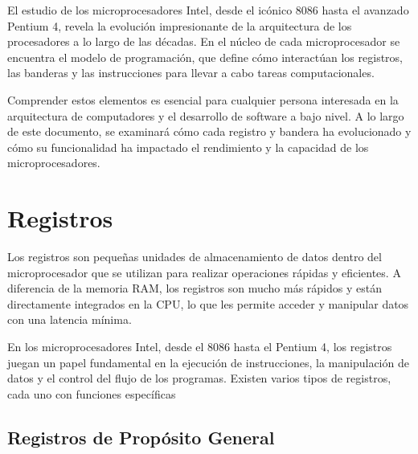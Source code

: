 

	\clearpage
	\vspace*{6pt}
	\begin{center}
		{\textbf{\huge \theTitle}}
	\end{center}
	\vspace*{8pt}


	El estudio de los microprocesadores Intel, desde el icónico 8086 hasta el avanzado
	Pentium 4, revela la evolución impresionante de la arquitectura de los procesadores a lo
	largo de las décadas. En el núcleo de cada microprocesador se encuentra el modelo de
	programación, que define cómo interactúan los registros, las banderas y las
	instrucciones para llevar a cabo tareas computacionales.

	Comprender estos elementos es esencial para cualquier persona interesada en la
	arquitectura de computadores y el desarrollo de software a bajo nivel. A lo largo de este
	documento, se examinará cómo cada registro y bandera ha evolucionado y cómo su
	funcionalidad ha impactado el rendimiento y la capacidad de los microprocesadores.

	\clearpage
	\section{Registros}

	Los registros son pequeñas unidades de almacenamiento de datos dentro del microprocesador
	que se utilizan para realizar operaciones rápidas y eficientes. A diferencia de la
	memoria RAM, los registros son mucho más rápidos y están directamente integrados en la
	CPU, lo que les permite acceder y manipular datos con una latencia mínima.

	En los microprocesadores Intel, desde el 8086 hasta el Pentium 4, los registros juegan
	un papel fundamental en la ejecución de instrucciones, la manipulación de datos y el control
	del flujo de los programas. Existen varios tipos de registros, cada uno con funciones específicas

	\subsection{Registros de Propósito General}

